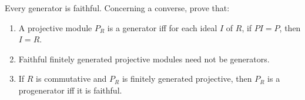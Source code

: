 Every generator is faithful. Concerning a converse, prove that:
\begin{enumerate}
    \item[(1)] A projective module $P_R$ is a generator iff for each ideal $I$ of $R$, if $PI = P$, then $I = R$.
    \item[(2)] Faithful finitely generated projective modules need not be generators.
    \item[(3)] If $R$ is commutative and $P_R$ is finitely generated projective, then $P_R$ is a progenerator iff it is faithful.
\end{enumerate}
